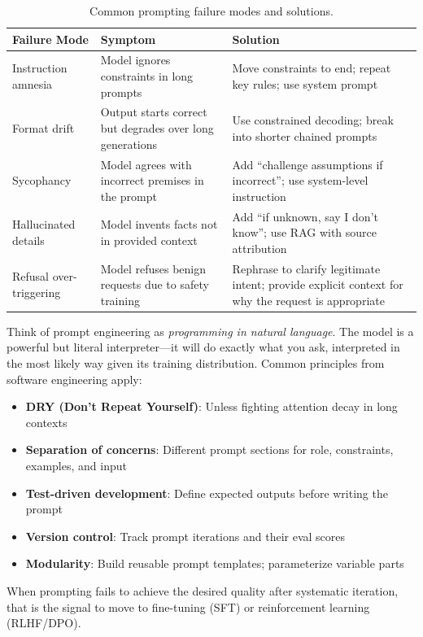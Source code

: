 \begin{table}[ht!]
\centering
\caption{Common prompting failure modes and solutions.}
\begin{tabular}{@{}lp{5cm}p{6.5cm}@{}}
\toprule
\textbf{Failure Mode} & \textbf{Symptom} & \textbf{Solution} \\
\midrule
Instruction amnesia & Model ignores constraints in long prompts & Move constraints to end; repeat key rules; use system prompt \\
Format drift & Output starts correct but degrades over long generations & Use constrained decoding; break into shorter chained prompts \\
Sycophancy & Model agrees with incorrect premises in the prompt & Add ``challenge assumptions if incorrect''; use system-level instruction \\
Hallucinated details & Model invents facts not in provided context & Add ``if unknown, say I don’t know''; use RAG with source attribution \\
Refusal over-triggering & Model refuses benign requests due to safety training & Rephrase to clarify legitimate intent; provide explicit context for why the request is appropriate \\
\bottomrule
\end{tabular}
\end{table}

\begin{intuitionbox}
Think of prompt engineering as \emph{programming in natural language}. The model is a powerful but literal interpreter---it will do exactly what you ask, interpreted in the most likely way given its training distribution. Common principles from software engineering apply:

\begin{itemize}
  \item \textbf{DRY (Don’t Repeat Yourself)}: Unless fighting attention decay in long contexts
  \item \textbf{Separation of concerns}: Different prompt sections for role, constraints, examples, and input
  \item \textbf{Test-driven development}: Define expected outputs before writing the prompt
  \item \textbf{Version control}: Track prompt iterations and their eval scores
  \item \textbf{Modularity}: Build reusable prompt templates; parameterize variable parts
\end{itemize}

When prompting fails to achieve the desired quality after systematic iteration, that is the signal to move to fine-tuning (SFT) or reinforcement learning (RLHF/DPO).
\end{intuitionbox}

